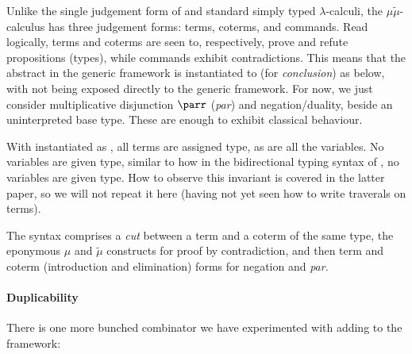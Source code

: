 Unlike the single judgement form of \name{} and standard simply typed
$\lambda$-calculi, the $\mu\tilde\mu$-calculus has three judgement forms:
terms, coterms, and commands.
Read logically, terms and coterms are seen to, respectively, prove and refute
propositions (types), while commands exhibit contradictions.
This means that the abstract  in the generic framework is
instantiated to  (for \emph{conclusion}) as below, with
 not being exposed directly to the generic framework.
For now, we just consider multiplicative disjunction $\parr$ (\emph{par}) and
negation/duality, beside an uninterpreted base type.
These are enough to exhibit classical behaviour.

\begin{minipage}[t]{0.5\textwidth}
  \centering
\end{minipage}
\begin{minipage}[t]{0.5\textwidth}
  \centering
\end{minipage}

With  instantiated as , all terms are assigned
 type, as are all the variables.
No variables are given  type, similar to how in
the bidirectional typing syntax of \citet[p.~25]{AACMM20}, no variables are
given  type.
How to observe this invariant is covered in the latter paper, so we will not
repeat it here (having not yet seen how to write traverals on terms).

The syntax comprises a \emph{cut} between a term and a coterm of the same type,
the eponymous $\mu$ and $\tilde\mu$ constructs for proof by contradiction, and
then term and coterm (introduction and elimination) forms for negation and
\emph{par}.




\paragraph{Duplicability}
There is one more bunched combinator we have experimented with adding to the
framework:

